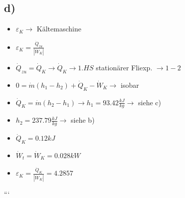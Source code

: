 \subsection*{d)}
\begin{itemize}
    \item \( \varepsilon_{K} \rightarrow \) Kältemaschine
    \item \( \varepsilon_{K} = \frac{\dot{Q}_{zu}}{\left| \dot{W}_{K} \right|} \)
    \item \( \dot{Q}_{zu} = \dot{Q}_{K} \rightarrow \dot{Q}_{K} \rightarrow 1. HS \) stationärer Fliexp. \( \rightarrow 1 - 2 \)
    \item \( 0 = \dot{m} (h_{1} - h_{2}) + \dot{Q}_{K} - \dot{W}_{K} \rightarrow \) isobar
    \item \( \dot{Q}_{K} = \dot{m} (h_{2} - h_{1}) \rightarrow h_{1} = 93.42 \frac{kJ}{kg} \rightarrow \) siehe c)
    \item \( h_{2} = 237.79 \frac{kJ}{kg} \rightarrow \) siehe b)
    \item \( \dot{Q}_{K} = 0.12 kJ \)
    \item \( \dot{W}_{t} = \dot{W}_{K} = 0.028 kW \)
    \item \( \varepsilon_{K} = \frac{\dot{Q}_{K}}{\left| \dot{W}_{K} \right|} = 4.2857 \)
\end{itemize}

```